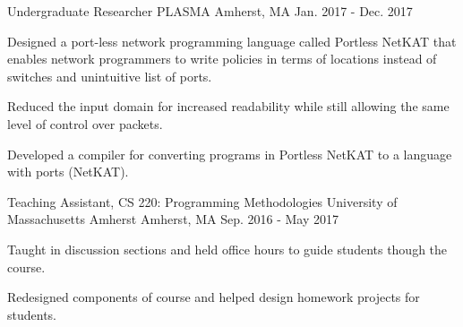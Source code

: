 

\begin{cventries}

  \cventry
    {Undergraduate Researcher} %
    {PLASMA} %
    {Amherst, MA} %
    {Jan. 2017 - Dec. 2017} %
    {
      \begin{cvitems} %
        \item Designed a port-less network programming language called Portless NetKAT that enables network programmers to write policies in terms of locations instead of switches and unintuitive list of ports. 
        \item Reduced the input domain for increased readability while still allowing the same level of control over packets.
        \item Developed a compiler for converting programs in Portless NetKAT to a language with ports (NetKAT).
      \end{cvitems}
    }

  \cventry
    {Teaching Assistant, CS 220: Programming Methodologies} %
    {University of Massachusetts Amherst} %
    {Amherst, MA} %
    {Sep. 2016 - May 2017} %
    {
      \begin{cvitems} %
      	\item Taught in discussion sections and held office hours to guide students though the course.
        \item Redesigned components of course and helped design homework projects for students.
      \end{cvitems}
    }

\end{cventries}
